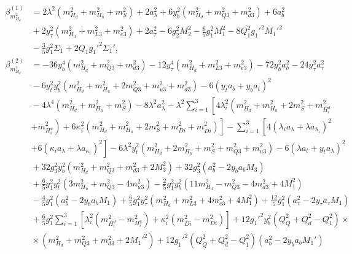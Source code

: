 \documentclass[preprint,amsmath,amssymb,aps,superscriptaddress,prd,showpacs,floatfix,nofootinbib]{revtex4-1}
\begin{document}
\begin{subequations}
\begin{align}
\beta_{m_{H_d}^2}^{(1)}&=2\lambda^2\left ( m_{H_d}^2+m_{H_u}^2+m_S^2\right )+2a_\lambda^2+6y_b^2\left ( m_{H_d}^2+m_{Q3}^2+m_{d3}^2\right )+6a_b^2\nonumber\\
&{}+2y_\tau^2\left ( m_{H_d}^2+m_{L3}^2+m_{e3}^2\right )+2a_\tau^2-6g_2^2 M_2^2-\frac{6}{5}g_1^2 M_1^2-8Q_1^2g_1'^2 M_1'^2\nonumber\\
&{}-\frac{3}{5}g_1^2\Sigma_1+2Q_1g_1'^2\Sigma_1',\label{eq:USSMmHd2BetaOneLoop}\\
\beta_{m_{H_d}^2}^{(2)}&=-36y_b^4\left ( m_{H_d}^2+m_{Q3}^2+m_{d3}^2\right )-12y_\tau^4\left ( m_{H_d}^2+m_{L3}^2+m_{e3}^2\right )-72y_b^2a_b^2-24y_\tau^2a_\tau^2\nonumber\\
&{}-6y_t^2y_b^2\left ( m_{H_d}^2+m_{H_u}^2+2m_{Q3}^2+m_{u3}^2+m_{d3}^2\right )-6\left ( y_t a_b+y_ba_t\right )^2\nonumber\\
&{}-4\lambda^4\left ( m_{H_d}^2+m_{H_u}^2+m_S^2\right )-8\lambda^2a_\lambda^2-\lambda^2\sum_{i=1}^3\left [ 4\lambda_i^2\left ( m_{H_d}^2+m_{H_u}^2+2m_S^2+m_{H_i^d}^2\right.\right.\nonumber\\
&{}\left.\left.+m_{H_i^u}^2\right )+6\kappa_i^2\left ( m_{H_d}^2+m_{H_u}^2+2m_S^2+m_{Di}^2+m_{\overline{D}i}^2\right )\right ]-\sum_{i=1}^3\left [ 4\left ( \lambda_i a_{\lambda}+\lambda a_{\lambda_i}\right )^2\right.\nonumber\\
&{}\left.+6\left ( \kappa_ia_\lambda+\lambda a_{\kappa_i}\right )^2\right ]-6\lambda^2y_t^2\left ( m_{H_d}^2+2m_{H_u}^2+m_S^2+m_{Q3}^2+m_{u3}^2\right )-6\left ( \lambda a_t+y_ta_\lambda\right )^2\nonumber\\
&{}+32g_3^2y_b^2\left ( m_{H_d}^2+m_{Q3}^2+m_{d3}^2+2M_3^2\right )+32g_3^2\left ( a_b^2-2y_ba_bM_3\right )\nonumber\\
&{}+\frac{6}{5}g_1^2y_t^2\left ( 3m_{H_u}^2+m_{Q3}^2-4m_{u3}^2\right )-\frac{2}{5}g_1^2y_b^2\left ( 11m_{H_d}^2-m_{Q3}^2-4m_{d3}^2+4M_1^2\right )\nonumber\\
&{}-\frac{4}{5}g_1^2\left ( a_b^2-2y_ba_bM_1\right )+\frac{6}{5}g_1^2y_\tau^2\left ( m_{H_d}^2+m_{L3}^2+4m_{e3}^2+4M_1^2\right )+\frac{12}{5}g_1^2\left ( a_\tau^2-2y_\tau a_\tau M_1\right )\nonumber\\
&{}+\frac{6}{5}g_1^2\sum_{i=1}^3\left [ \lambda_i^2\left ( m_{H_i^d}^2-m_{H_i^u}^2\right )+\kappa_i^2\left ( m_{\overline{D}i}^2-m_{Di}^2\right )\right ]+12g_1'^2y_b^2\left ( Q_Q^2+Q_d^2-Q_1^2\right )\times\nonumber\\
&{}\times\left ( m_{H_d}^2+m_{Q3}^2+m_{d3}^2+2M_1'^2\right )+12g_1'^2\left ( Q_Q^2+Q_d^2-Q_1^2\right )\left ( a_b^2-2y_ba_bM_1'\right )\nonumber\\

\end{align}
\end{subequations}
\end{document}
